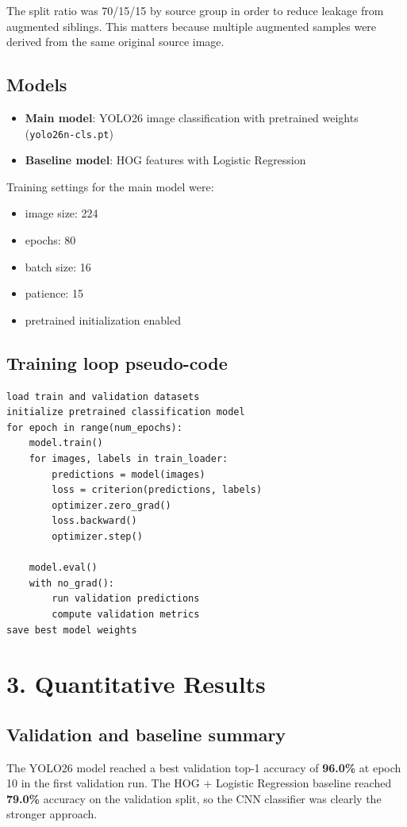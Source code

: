 \documentclass[11pt,a4paper]{article}
\begin{document}
The split ratio was 70/15/15 by source group in order to reduce leakage from augmented siblings. This matters because multiple augmented samples were derived from the same original source image.

\subsection*{Models}
\begin{itemize}[leftmargin=*]
  \item \textbf{Main model}: YOLO26 image classification with pretrained weights (\texttt{yolo26n-cls.pt})
  \item \textbf{Baseline model}: HOG features with Logistic Regression
\end{itemize}

Training settings for the main model were:
\begin{itemize}[leftmargin=*]
  \item image size: 224
  \item epochs: 80
  \item batch size: 16
  \item patience: 15
  \item pretrained initialization enabled
\end{itemize}

\subsection*{Training loop pseudo-code}
\begin{verbatim}
load train and validation datasets
initialize pretrained classification model
for epoch in range(num_epochs):
    model.train()
    for images, labels in train_loader:
        predictions = model(images)
        loss = criterion(predictions, labels)
        optimizer.zero_grad()
        loss.backward()
        optimizer.step()

    model.eval()
    with no_grad():
        run validation predictions
        compute validation metrics
save best model weights
\end{verbatim}

\section*{3. Quantitative Results}
\subsection*{Validation and baseline summary}
The YOLO26 model reached a best validation top-1 accuracy of \textbf{96.0\%} at epoch 10 in the first validation run. The HOG + Logistic Regression baseline reached \textbf{79.0\%} accuracy on the validation split, so the CNN classifier was clearly the stronger approach.
\end{document}
